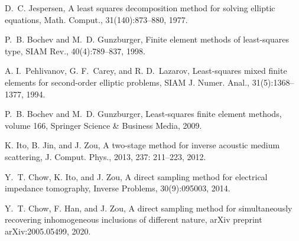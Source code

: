 \documentclass[11pt]{article}%
\renewcommand{\_}{{\fontfamily{ptm}\selectfont\textunderscore}}
\theoremstyle{plain}
\numberwithin{equation}{section}
\begin{document}
\begin{thebibliography}{lsq}
D.~C. Jespersen, A least squares decomposition method for solving elliptic equations, Math. Comput., 31(140):873--880, 1977.

P.~B. Bochev and M.~D. Gunzburger, Finite element methods of least-squares type, SIAM Rev., 40(4):789--837, 1998.



A. I.~Pehlivanov, G. F.~Carey, and R. D.~Lazarov,  Least-squares mixed finite elements for second-order elliptic problems, SIAM J. Numer. Anal., 31(5):1368--1377, 1994.

P.~B. Bochev and M.~D. Gunzburger, Least-squares finite element methods, volume 166, Springer Science \& Business Media, 2009.

K. Ito, B. Jin, and J. Zou,  A two-stage method for inverse acoustic medium scattering, J. Comput. Phys., 2013, 237: 211--223, 2012.



%
%
%
%
%
%

%
%


Y.~T. Chow, K. Ito, and J. Zou,  A direct sampling method for electrical impedance tomography,  Inverse Problems, 30(9):095003, 2014.

Y.~T. Chow, F. Han, and J. Zou, A direct sampling method for simultaneously recovering inhomogeneous
  inclusions of different nature, arXiv preprint arXiv:2005.05499, 2020.


\end{thebibliography}
\end{document}
